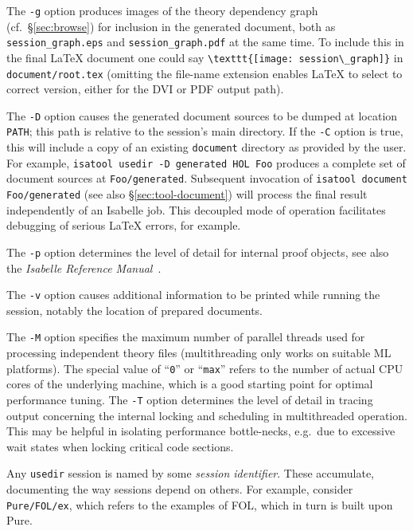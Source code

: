 \medskip The \texttt{-g} option produces images of the theory dependency graph
(cf.\ \S\ref{sec:browse}) for inclusion in the generated document, both as
\texttt{session_graph.eps} and \texttt{session_graph.pdf} at the same time.
To include this in the final {\LaTeX} document one could say
\verb,\texttt{[image: session\_graph]}, in \texttt{document/root.tex} (omitting
the file-name extension enables {\LaTeX} to select to correct version, either
for the DVI or PDF output path).

\medskip The \texttt{-D} option causes the generated document sources to be
dumped at location \texttt{PATH}; this path is relative to the session's main
directory.  If the \texttt{-C} option is true, this will include a copy of an
existing \texttt{document} directory as provided by the user.  For example,
\texttt{isatool usedir -D generated HOL Foo} produces a complete set of
document sources at \texttt{Foo/generated}.  Subsequent invocation of
\texttt{isatool document Foo/generated} (see also \S\ref{sec:tool-document})
will process the final result independently of an Isabelle job.  This
decoupled mode of operation facilitates debugging of serious {\LaTeX} errors,
for example.

\medskip The \texttt{-p} option determines the level of detail for internal
proof objects, see also the \emph{Isabelle Reference
  Manual}~\cite{isabelle-ref}.

\medskip The \texttt{-v} option causes additional information to be printed
while running the session, notably the location of prepared documents.

\medskip The \texttt{-M} option specifies the maximum number of
parallel threads used for processing independent theory files
(multithreading only works on suitable ML platforms).  The special
value of ``\texttt{0}'' or ``\texttt{max}'' refers to the number of
actual CPU cores of the underlying machine, which is a good starting
point for optimal performance tuning.  The \texttt{-T} option
determines the level of detail in tracing output concerning the
internal locking and scheduling in multithreaded operation.  This may
be helpful in isolating performance bottle-necks, e.g.\ due to
excessive wait states when locking critical code sections.

\medskip Any \texttt{usedir} session is named by some \emph{session
  identifier}. These accumulate, documenting the way sessions depend on
others. For example, consider \texttt{Pure/FOL/ex}, which refers to the
examples of FOL, which in turn is built upon Pure.

